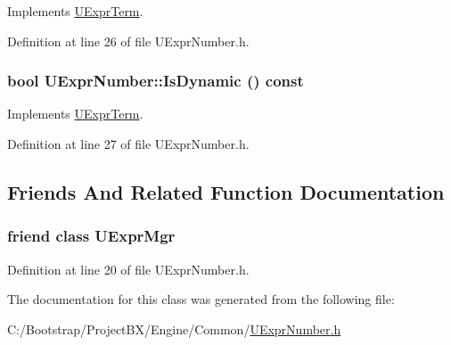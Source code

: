 Implements \hyperlink{class_u_expr_term_85274403764fb0e4cc701a0374fd6592}{UExprTerm}.

Definition at line 26 of file UExprNumber.h.\hypertarget{class_u_expr_number_497a19a47c735974f54b0a50b8e2d869}{
\subsubsection[{IsDynamic}]{\setlength{\rightskip}{0pt plus 5cm}bool UExprNumber::IsDynamic () const}}
\label{class_u_expr_number_497a19a47c735974f54b0a50b8e2d869}




Implements \hyperlink{class_u_expr_term_0b0a24c60fecb1a7388e4b01e2f73572}{UExprTerm}.

Definition at line 27 of file UExprNumber.h.

\subsection{Friends And Related Function Documentation}
\hypertarget{class_u_expr_number_aba1a84b84f2ff7cab4b76539215bd34}{
\subsubsection[{UExprMgr}]{\setlength{\rightskip}{0pt plus 5cm}friend class {\bf UExprMgr}}}
\label{class_u_expr_number_aba1a84b84f2ff7cab4b76539215bd34}




Definition at line 20 of file UExprNumber.h.

The documentation for this class was generated from the following file:\begin{CompactItemize}
\item 
C:/Bootstrap/ProjectBX/Engine/Common/\hyperlink{_u_expr_number_8h}{UExprNumber.h}\end{CompactItemize}
